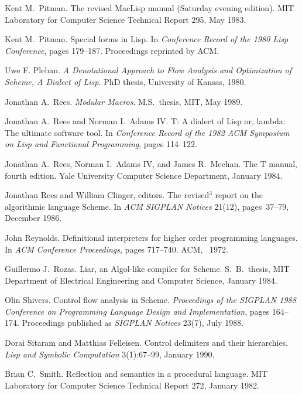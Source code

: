 \begin{thebibliography}{999}

Kent M.~Pitman.
The revised MacLisp manual (Saturday evening edition).
MIT Laboratory for Computer Science Technical Report 295, May 1983.

Kent M.~Pitman.
Special forms in Lisp.
In {\em Conference Record of the 1980 Lisp Conference}, pages 179--187.
Proceedings reprinted by ACM.

Uwe F. Pleban.
{\em A Denotational Approach to Flow Analysis and Optimization of Scheme,
A Dialect of Lisp.} PhD thesis, University of Kansas, 1980.

Jonathan A.~Rees.
{\em Modular Macros}.
M.S.~thesis, MIT, May 1989.

Jonathan A.~Rees and Norman I.~Adams IV.
T: A dialect of Lisp or, lambda: The ultimate software tool.
In {\em Conference Record of the 1982 ACM Symposium on Lisp and
  Functional Programming}, pages 114--122.

Jonathan A.~Rees, Norman I.~Adams IV, and James R.~Meehan.
The T manual, fourth edition.
Yale University Computer Science Department, January 1984.

Jonathan Rees and William Clinger, editors.
The revised$^3$ report on the algorithmic language Scheme.
In {\em ACM SIGPLAN Notices} 21(12), pages~37--79, December 1986.

John Reynolds.
Definitional interpreters for higher order programming languages.
In {\em ACM Conference Proceedings}, pages 717--740.
ACM, ~1972.

Guillermo J.~Rozas.
Liar, an Algol-like compiler for Scheme.
S.~B.~thesis, MIT Department of Electrical Engineering and Computer
  Science, January 1984.

Olin Shivers.
Control flow analysis in Scheme.
{\em Proceedings of the SIGPLAN 1988 Conference on
  Programming Language Design and Implementation}, pages 164--174.
Proceedings published as {\em SIGPLAN Notices} 23(7), July 1988.

Dorai Sitaram and Matthias Felleisen.
Control delimiters and their hierarchies.
{\em Lisp and Symbolic Computation} 3(1):67--99, January 1990.


Brian C.~Smith.
Reflection and semantics in a procedural language.
MIT Laboratory for Computer Science Technical Report 272, January 1982.


\end{thebibliography}
